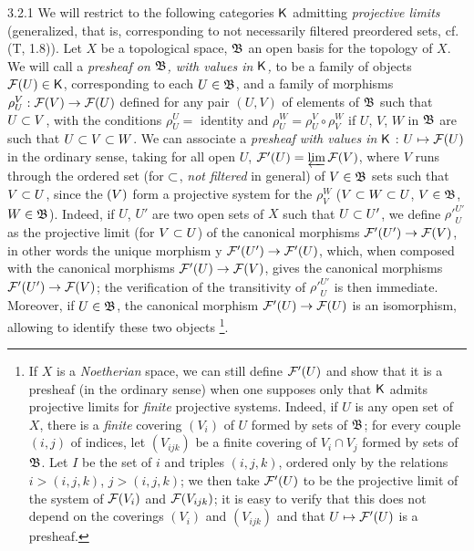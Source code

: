 \documentclass[../main.tex]{subfiles}
\begin{document}
\begin{env}{3.2.1}
We will restrict to the following categories $\mathsf{K}$ admitting
\emph{projective limits} (generalized, that is, corresponding to not necessarily filtered preordered sets,
cf. (T, 1.8)). Let $X$ be a topological space, $\mathfrak{B}$ an open basis
for the topology of $X$. We will call a \emph{presheaf on $\mathfrak{B}$, with values in $\mathsf{K}$,} to be
a family of objects $\mathcal{F}(U)\in\mathsf{K}$, corresponding to each $U\in\mathfrak{B}$, and a family of morphisms
$\rho_U^V:\mathcal{F}(V)\to\mathcal{F}(U)$ defined for any pair $(U,V)$ of elements of $\mathfrak{B}$ such that $U\subset V$,
with the conditions $\rho_U^U=$ identity and $\rho_U^W=\rho_U^V\circ\rho_V^W$ if $U$, $V$, $W$ in
$\mathfrak{B}$ are such that $U\subset V\subset W$. We can associate a \emph{presheaf with values in} $\mathsf{K}$ : $U\mapsto\mathcal{F}(U)$
in the ordinary sense, taking for all open $U$, $\mathcal{F}'(U)=\varprojlim\mathcal{F}(V)$, where $V$ runs through
the ordered set (for $\subset$, \emph{not filtered} in general) of $V\in\mathfrak{B}$ sets such that $V\subset U$, since
the $\mathcal(V)$ form a projective system for the $\rho_V^W$ ($V\subset W\subset U$, $V\in\mathfrak{B}$, $W\in\mathfrak{B}$).
Indeed, if $U$, $U'$ are two open sets of $X$ such that $U\subset U'$, we define ${\rho'}_U^{U'}$ as the
projective limit (for $V\subset U$) of the canonical morphisms $\mathcal{F}'(U')\to\mathcal{F}(V)$, in other words
the unique morphism y $\mathcal{F}'(U')\to\mathcal{F}'(U)$, which, when composed with the canonical morphisms
$\mathcal{F}'(U)\to\mathcal{F}(V)$, gives the canonical morphisms $\mathcal{F}'(U')\to\mathcal{F}(V)$; the verification of
the transitivity of ${\rho'}_U^{U'}$ is then immediate. Moreover, if $U\in\mathfrak{B}$,
the canonical morphism $\mathcal{F}'(U)\to\mathcal{F}(U)$ is an isomorphism, allowing to identify these two objects
\footnote{
If $X$ is a \emph{Noetherian} space, we can still define $\mathcal{F}'(U)$ and show that it is a presheaf (in the
ordinary sense) when one supposes only that $\mathsf{K}$ admits projective limits for \emph{finite} projective systems. Indeed,
if $U$ is any open set of $X$, there is a \emph{finite} covering $(V_i)$ of $U$ formed by sets of $\mathfrak{B}$; for every
couple $(i,j)$ of indices, let $(V_{ijk})$ be a finite covering of $V_i\cap V_j$ formed by sets of $\mathfrak{B}$. Let $I$ be the set
of $i$ and triples $(i,j,k)$, ordered only by the relations $i>(i,j,k)$, $j>(i,j,k)$; we then take $\mathcal{F}'(U)$ to be
the projective limit of the system of $\mathcal{F}(V_i)$ and $\mathcal{F}(V_{ijk})$; it is easy to verify that this does not depend on the
coverings $(V_i)$ and $(V_{ijk})$ and that $U\mapsto\mathcal{F}'(U)$ is a presheaf.}.
\end{env}
\end{document}
